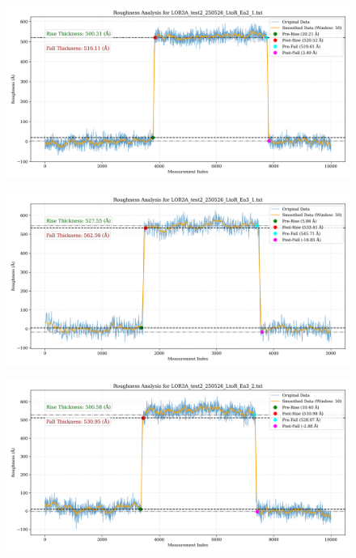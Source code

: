 \documentclass[platex,dvipdfmx,10pt,twoside,a4paper,jis2004]{jsarticle}
\begin{document}
\begin{figure}[H]
    \centering
    \includegraphics[width=\textwidth]{LOR3A_test2_250526_LtoR_Ea2_1.png}
    \label{fig:LOR3Atest2250526LtoREa21}
\end{figure}
\begin{figure}[H]
    \centering
    \includegraphics[width=\textwidth]{LOR3A_test2_250526_LtoR_Ea3_1.png}
    \label{fig:LOR3Atest2250526LtoREa31}
\end{figure}
\begin{figure}[H]
    \centering
    \includegraphics[width=\textwidth]{LOR3A_test2_250526_LtoR_Ea3_2.png}
    \label{fig:LOR3Atest2250526LtoREa32}
\end{figure}
\end{document}

